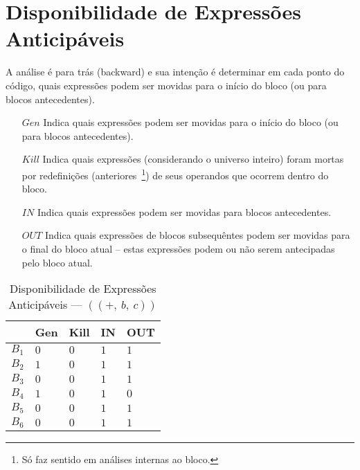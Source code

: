\section{Disponibilidade de Express\~oes Anticip\'aveis}

A an\'alise \'e para tr\'as (\textsf{backward}) e sua inten\c{c}\~ao \'e determinar em cada ponto do c\'odigo, quais express\~oes podem ser movidas para o in\'icio do bloco (ou para blocos antecedentes).
\begin{itemize}
  \item[$Gen$] Indica quais express\~oes podem ser movidas para o in\'icio do bloco (ou para blocos antecedentes).
  \item[$Kill$] Indica quais express\~oes (considerando o universo inteiro) foram mortas por redefini\c{c}\~oes (anteriores~\footnote{S\'o faz sentido em an\'alises internas ao bloco.}) de seus operandos que ocorrem dentro do bloco.
  \item[$IN$] Indica quais express\~oes podem ser movidas para blocos antecedentes.
  \item[$OUT$] Indica quais express\~oes de blocos subsequ\^entes podem ser movidas para o final do bloco atual -- estas express\~oes podem ou n\~ao serem antecipadas pelo bloco atual.
\end{itemize}

\begin{table}[ht]
\centering
\begin{tabular}{l|l|l|l|l}
	& Gen & Kill & IN & OUT\\
\hline
$B_{1}$ &  $0$ & $0$ & $1$ & $1$\\
$B_{2}$ &  $1$ & $0$ & $1$ & $1$\\
$B_{3}$ &  $0$ & $0$ & $1$ & $1$\\
$B_{4}$ &  $1$ & $0$ & $1$ & $0$\\
$B_{5}$ &  $0$ & $0$ & $1$ & $1$\\
$B_{6}$ &  $0$ & $0$ & $1$ & $1$\\
\end{tabular}
\caption{Disponibilidade de Express\~oes Anticip\'aveis --- $((+,\:b,\:c))$}
\end{table}


